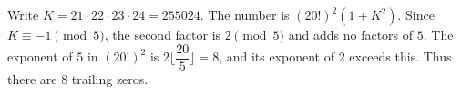 Write $K=21\cdot22\cdot23\cdot24=255024$. The number is $(20!)^2(1+K^2)$. Since $K\equiv-1\pmod5$, the second factor is $2\pmod5$ and adds no factors of $5$. The exponent of $5$ in $(20!)^2$ is $2 \lfloor \dfrac{20}{5} \rfloor = 8$, and its exponent of $2$ exceeds this. Thus there are $\boxed8$ trailing zeros.
